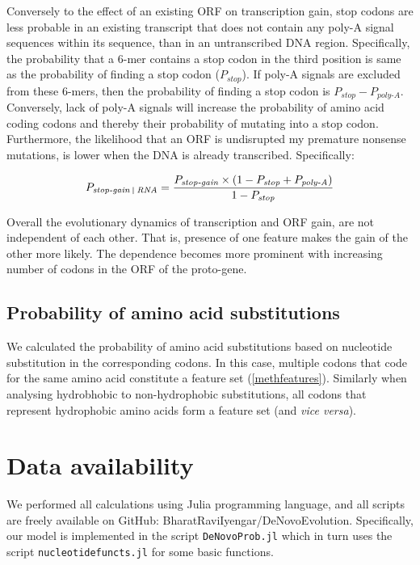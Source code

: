 \documentclass[12pt,a4paper]{article}
\begin{document}
Conversely to the effect of an existing ORF on transcription gain, stop codons are less probable in an existing transcript that does not contain any poly-A signal sequences within its sequence, than in an untranscribed DNA region. Specifically, the probability that a 6-mer contains a stop codon in the third position is same as the probability of finding a stop codon ($P_\textit{stop}$). If poly-A signals are excluded from these 6-mers, then the probability of finding a stop codon is $P_\textit{stop} - P_\textit{poly-A}$. Conversely, lack of poly-A signals will increase the probability of amino acid coding codons and thereby their probability of mutating into a stop codon. Furthermore, the likelihood that an ORF is undisrupted my premature nonsense mutations, is lower when the DNA is already transcribed. Specifically:

$$P_\textit{stop-gain \vline\ RNA} = \frac{P_\textit{stop-gain}\times(1- P_\textit{stop} + P_\textit{poly-A})}{1- P_\textit{stop}}$$

Overall the evolutionary dynamics of transcription and ORF gain, are not independent of each other. That is, presence of one feature makes the gain of the other more likely. The dependence becomes more prominent with increasing number of codons in the ORF of the proto-gene.

\subsection{Probability of amino acid substitutions}

We calculated the probability of amino acid substitutions based on nucleotide substitution in the corresponding codons. In this case, multiple codons that code for the same amino acid constitute a feature set (\autoref{methfeatures}). Similarly when analysing hydrobhobic to non-hydrophobic substitutions, all codons that represent hydrophobic amino acids form a feature set (and \textit{vice versa}).

\section{Data availability}
We performed all calculations using Julia programming language, and all scripts are freely available on GitHub: BharatRaviIyengar/DeNovoEvolution. Specifically, our model is implemented in the script \texttt{DeNovoProb.jl} which in turn uses the script \texttt{nucleotidefuncts.jl} for some basic functions.



\small

\end{document}

